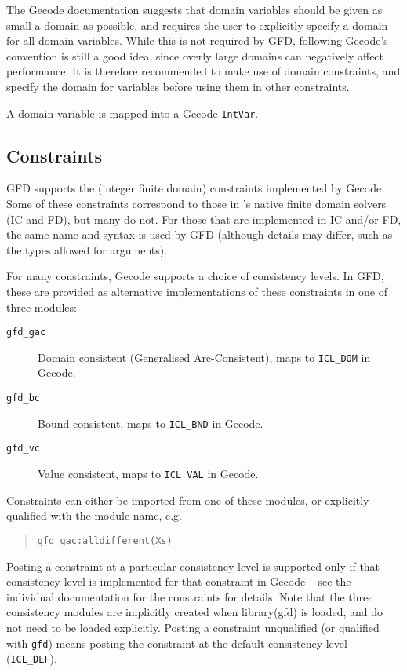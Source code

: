 The Gecode documentation suggests that domain variables should be given as
small a domain as possible, and requires the user to explicitly specify a domain for 
all domain variables. While this is not required by GFD, following Gecode's
convention is still a good idea, since overly large domains can negatively
affect performance.  It is therefore recommended to make use of domain
constraints, and specify the domain for variables before using them in other
constraints.

A domain variable is mapped into a Gecode \verb'IntVar'.


\subsection{Constraints}

GFD supports the (integer finite domain) constraints implemented by Gecode.
Some of these constraints correspond to those in \eclipse's native finite 
domain solvers (IC and FD), but many do not. For those that are 
implemented in IC and/or FD, the same name and syntax is used by GFD 
(although details may differ, such as the types allowed for arguments).  

For many constraints, Gecode supports a choice of consistency levels.
In GFD, these are provided as alternative implementations of these
constraints in one of three modules:
\begin{description}
\item[{\tt gfd_gac}] Domain consistent (Generalised Arc-Consistent), maps to {\tt ICL_DOM} in Gecode.
\item[{\tt gfd_bc}] Bound consistent, maps to {\tt ICL_BND} in Gecode.
\item[{\tt gfd_vc}] Value consistent, maps to {\tt ICL_VAL} in Gecode.
\end{description}
Constraints can either be imported from one of these modules, or explicitly
qualified with the module name, e.g.
\begin{quote}
\begin{verbatim}
gfd_gac:alldifferent(Xs)
\end{verbatim}
\end{quote}
Posting a constraint at a particular consistency level is supported only
if that consistency level is implemented for that constraint
in Gecode -- see the individual documentation for the constraints for details.
Note that the three consistency modules are implicitly created when library(gfd)
is loaded, and do not need to be loaded explicitly.
Posting a constraint unqualified (or qualified with {\tt gfd}) 
means posting the constraint at the default consistency level ({\tt ICL_DEF}). 


